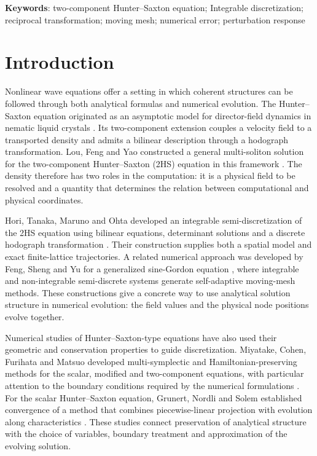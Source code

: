 \documentclass{article}
\begin{document}
{\bfseries Keywords}: two-component Hunter–Saxton equation; Integrable discretization; reciprocal transformation; moving mesh; numerical error; perturbation response

\FloatBarrier
\section{Introduction}

Nonlinear wave equations offer a setting in which coherent structures can be followed through both analytical formulas and numerical evolution. The Hunter--Saxton equation originated as an asymptotic model for director-field dynamics in nematic liquid crystals \cite{hunter1991}. Its two-component extension couples a velocity field to a transported density and admits a bilinear description through a hodograph transformation. Lou, Feng and Yao constructed a general multi-soliton solution for the two-component Hunter--Saxton (2HS) equation in this framework \cite{lou2016}. The density therefore has two roles in the computation: it is a physical field to be resolved and a quantity that determines the relation between computational and physical coordinates.

Hori, Tanaka, Maruno and Ohta developed an integrable semi-discretization of the 2HS equation using bilinear equations, determinant solutions and a discrete hodograph transformation \cite{hori2026}. Their construction supplies both a spatial model and exact finite-lattice trajectories. A related numerical approach was developed by Feng, Sheng and Yu for a generalized sine-Gordon equation \cite{feng2023}, where integrable and non-integrable semi-discrete systems generate self-adaptive moving-mesh methods. These constructions give a concrete way to use analytical solution structure in numerical evolution: the field values and the physical node positions evolve together.

Numerical studies of Hunter--Saxton-type equations have also used their geometric and conservation properties to guide discretization. Miyatake, Cohen, Furihata and Matsuo developed multi-symplectic and Hamiltonian-preserving methods for the scalar, modified and two-component equations, with particular attention to the boundary conditions required by the numerical formulations \cite{miyatake2017}. For the scalar Hunter--Saxton equation, Grunert, Nordli and Solem established convergence of a method that combines piecewise-linear projection with evolution along characteristics \cite{grunert2021}. These studies connect preservation of analytical structure with the choice of variables, boundary treatment and approximation of the evolving solution.
\end{document}
